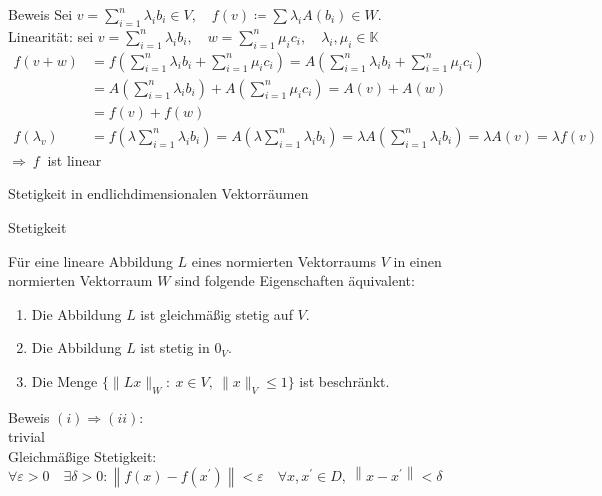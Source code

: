 \documentclass[AERbeamer%
,handout%
,optBeamerClassicFormat%
,optLeftEquations   %
]{AERlatex}
\begin{document}
    \begin{frame}{Beweis}
        \setlength{\baselineskip}{1.6\baselineskip}
%
        Sei $v=\sum_{i=1}^n \lambda_i b_i \in V, \quad f(v)\coloneqq\sum \lambda_i A\left(b_i\right) \in W$. \\
        Linearität: sei $v=\sum_{i=1}^n \lambda_i b_i, \quad w=\sum_{i=1}^n \mu_i c_i, \quad \lambda_i, \mu_i \in \mathbb{K}$
        \begin{equation*}
            \begin{aligned}
                f(v+w) &=f\left(\sum_{i=1}^n \lambda_i b_i+\sum_{i=1}^n \mu_i c_i\right)=A\left(\sum_{i=1}^n \lambda_i b_i+\sum_{i=1}^n \mu_i c_i\right) \\
                &=A\left(\sum_{i=1}^n \lambda_i b_i\right)+A\left(\sum_{i=1}^n \mu_i c_i\right)=A(v)+A(w) \\
                &=f(v)+f(w) \\
                f\left(\lambda_v\right) &=f\left(\lambda \sum_{i=1}^n \lambda_i b_i\right)=A\left(\lambda \sum_{i=1}^n \lambda_i b_i\right)=\lambda A\left(\sum_{i=1}^n \lambda_i b_i\right)=\lambda A(v)=\lambda f(v)
            \end{aligned}
        \end{equation*}
        $\Rightarrow ~ f ~$ ist linear
    \end{frame}
%
    \begin{frame}{Stetigkeit in endlichdimensionalen Vektorräumen}
    \end{frame}
%
    \begin{frame}{Stetigkeit}
        \begin{Satz}
            Für eine lineare Abbildung $L$ eines normierten Vektorraums $V$ in einen normierten Vektorraum $W$ sind folgende Eigenschaften äquivalent:
            \begin{enumerate}
                [label=$(\roman*)$, leftmargin=2em]
                \item Die Abbildung $L$ ist gleichmäßig stetig auf $V$.
                \item Die Abbildung $L$ ist stetig in $0_V$.
                \item Die Menge $\{\|Lx\|_W: ~ x \in V, ~ \|x\|_V \leq 1\}$ ist beschränkt.
            \end{enumerate}
        \end{Satz}
    \end{frame}
%
    \begin{frame}{Beweis}
        \setlength{\baselineskip}{1.6\baselineskip}
%
        $(i) \Rightarrow (ii)$:\\ \pause
        trivial \\ \pause
        \vspace{1em}
        Gleichmäßige Stetigkeit:
        $\forall \varepsilon>0 \quad \exists \delta>0: \left\|f(x)-f\left(x^{\prime}\right)\right\|<\varepsilon \quad \forall x, x^{\prime} \in D, ~ \left\|x-x^{\prime}\right\|<\delta$
    \end{frame}
\end{document}
